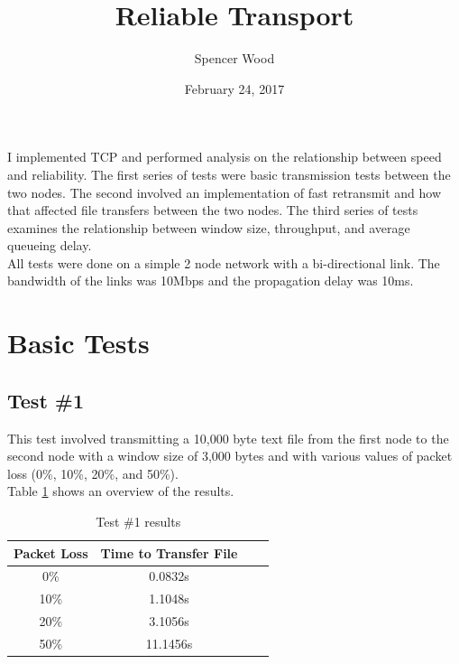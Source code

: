 \documentclass[fleqn,11pt]{article}
\begin{document}
\lstset{
  language=Python,
  basicstyle=\small,          %
  keywordstyle=\bfseries,
  identifierstyle=,           %
  commentstyle=,              %
  stringstyle=\ttfamily,      %
  showstringspaces=false,     %
  numbers=left,
  numberstyle=\tiny,
  numbersep=5pt,
  frame=tb,
}

\title{Reliable Transport}

\author{Spencer Wood}

\date{February 24, 2017}

\maketitle


I implemented TCP and performed analysis on the relationship between speed and
reliability. The first series of tests were basic transmission tests between the
two nodes. The second involved an implementation of fast retransmit and how
that affected file transfers between the two nodes. The third series of tests
examines the relationship between window size, throughput, and average queueing
delay.\\

All tests were done on a simple 2 node network with a bi-directional link. The
bandwidth of the links was 10Mbps and the propagation delay was 10ms.

\section{Basic Tests}

\subsection{Test \#1}

\indent\indent This test involved transmitting a 10,000 byte text file from the
first node to the second node with a window size of 3,000 bytes and with
various values of packet loss (0\%, 10\%, 20\%, and 50\%).\\

Table \ref{tab:basic_overview_1} shows an overview of the results.

\begin{table}[h]
  \caption{Test \#1 results}
  \label{tab:basic_overview_1}
  \begin{center}
    \begin{tabular}{cccc}
      \toprule
      Packet Loss & Time to Transfer File \\
      \midrule
      0\% & 0.0832s \\
      10\% & 1.1048s \\
      20\% & 3.1056s \\
      50\% & 11.1456s \\
      \bottomrule
    \end{tabular}
  \end{center}
\end{table}
\end{document}
